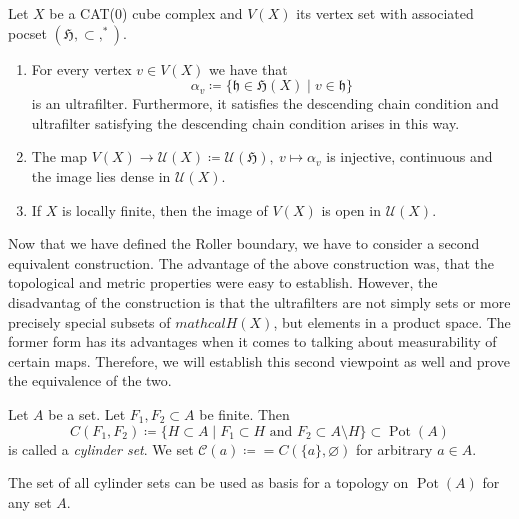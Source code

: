 \begin{thm}
  Let \(X\) be a CAT(0) cube complex and \(V(X)\) its vertex set with associated pocset \((\mathfrak{H}, \subset, ^\ast)\).
  \begin{enumerate}
  \item For every vertex \(v \in V(X)\) we have that
    \[
      \alpha_v \coloneqq \{\mathfrak{h} \in \mathfrak{H}(X) \mid v \in \mathfrak{h}\}
    \]
    is an ultrafilter. Furthermore, it satisfies the descending chain condition and ultrafilter satisfying the descending chain condition arises in this way.
  \item The map \(V(X) \to \mathcal{U}(X) \coloneqq \mathcal{U}(\mathfrak{H}),\ v \mapsto \alpha_v\) is injective, continuous and the image lies dense in \(\mathcal{U}(X)\). 
  \item If \(X\) is locally finite, then the image of \(V(X)\) is open in \(\mathcal{U}(X)\).
  \end{enumerate}
\end{thm}

Now that we have defined the Roller boundary, we have to consider a second equivalent construction. The advantage of the above construction was, that the topological and metric properties were easy to establish. However, the disadvantag of the construction is that the ultrafilters are not simply sets or more precisely special subsets of \(mathcal{H}(X)\), but elements in a product space. The former form has its advantages when it comes to talking about measurability of certain maps. Therefore, we will establish this second viewpoint as well and prove the equivalence of the two.

\begin{defin}
  \label{def:pot-top}
  Let \(A\) be a set. Let \(F_1, F_2 \subset A\) be finite. Then
  \[
    C(F_1, F_2) \coloneqq \{ H \subset A \mid F_1 \subset H \text{ and } F_2 \subset A \setminus H\} \subset \operatorname{Pot}(A)
  \]
  is called a \emph{cylinder set}. We set \(\mathcal{C}(a) \coloneqq = C(\{a\}, \varnothing)\) for arbitrary \(a \in A\).
\end{defin}

\begin{prop}
  \label{prop:pot-top}
  The set of all cylinder sets can be used as basis for a topology on \(\operatorname{Pot}(A)\) for any set \(A\).
\end{prop}

